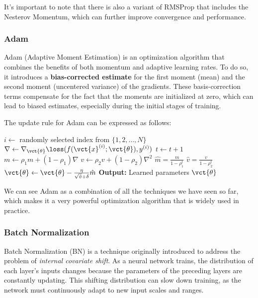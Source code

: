 It's important to note that there is also a variant of RMSProp that includes the Nesterov Momentum, which can further improve convergence and performance.

\subsubsection*{Adam}
Adam (Adaptive Moment Estimation) is an optimization algorithm that combines the benefits of both momentum and adaptive learning rates.
To do so, it introduces a \textbf{bias-corrected estimate} for the first moment (mean) and the second moment (uncentered variance) of the gradients.
These basis-correction terms compensate for the fact that the moments are initialized at zero, which can lead to biased estimates, especially during 
the initial stages of training.

The update rule for Adam can be expressed as follows:
\begin{algorithm}[H]
    \caption{Adam}
    \begin{algorithmic}[1]
            \State $i \leftarrow$ randomly selected index from $\{1, 2, \ldots, N\}$
            \State $\nabla \leftarrow \nabla_{\vct{\theta}} \loss(f(\vct{x}^{(i)}; \vct{\theta}), y^{(i)})$
            \State $t \leftarrow t + 1$ 
            \State $m \leftarrow \rho_1 m + (1 - \rho_1) \nabla$ 
            \State $v \leftarrow \rho_2 v + (1 - \rho_2) \nabla^2$ 
            \State $\hat{m} = \frac{m}{1 - \rho_1^t}$ 
            \State $\hat{v} = \frac{v}{1 - \rho_2^t}$ 
            \State $\vct{\theta} \leftarrow \vct{\theta} - \frac{\eta}{\sqrt{\hat{v}} + \delta} \hat{m}$ 
        \EndWhile
        \State \textbf{Output:} Learned parameters $\vct{\theta}$
    \end{algorithmic}
\end{algorithm}
We can see Adam as a combination of all the techniques we have seen so far, which makes it a very powerful optimization algorithm that is widely used in practice.

\subsubsection{Batch Normalization}
Batch Normalization (BN) is a technique originally introduced to address the problem of \textit{internal covariate shift}. 
As a neural network trains, the distribution of each layer's inputs changes because the parameters of the preceding layers are constantly updating. 
This shifting distribution can slow down training, as the network must continuously adapt to new input scales and ranges.

